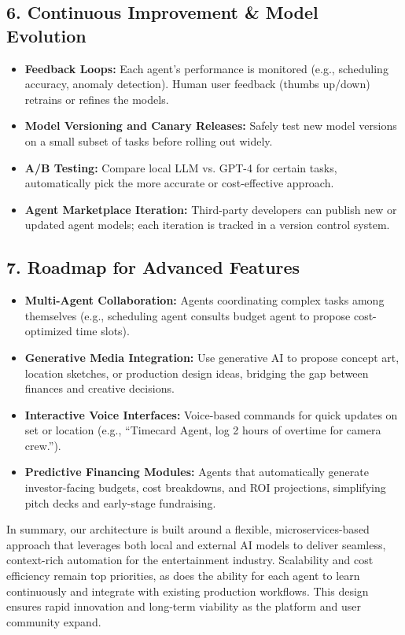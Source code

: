 \documentclass[11pt]{article}
\begin{document}
\subsection{6. Continuous Improvement \& Model Evolution}
\begin{itemize}
    \item \textbf{Feedback Loops:} Each agent’s performance is monitored (e.g., scheduling accuracy, anomaly detection). Human user feedback (thumbs up/down) retrains or refines the models.
    \item \textbf{Model Versioning and Canary Releases:} Safely test new model versions on a small subset of tasks before rolling out widely.
    \item \textbf{A/B Testing:} Compare local LLM vs. GPT-4 for certain tasks, automatically pick the more accurate or cost-effective approach.
    \item \textbf{Agent Marketplace Iteration:} Third-party developers can publish new or updated agent models; each iteration is tracked in a version control system.
\end{itemize}

\subsection{7. Roadmap for Advanced Features}
\begin{itemize}
    \item \textbf{Multi-Agent Collaboration:} Agents coordinating complex tasks among themselves (e.g., scheduling agent consults budget agent to propose cost-optimized time slots).
    \item \textbf{Generative Media Integration:} Use generative AI to propose concept art, location sketches, or production design ideas, bridging the gap between finances and creative decisions.
    \item \textbf{Interactive Voice Interfaces:} Voice-based commands for quick updates on set or location (e.g., “Timecard Agent, log 2 hours of overtime for camera crew.”).
    \item \textbf{Predictive Financing Modules:} Agents that automatically generate investor-facing budgets, cost breakdowns, and ROI projections, simplifying pitch decks and early-stage fundraising.
\end{itemize}

In summary, our architecture is built around a flexible, microservices-based approach that leverages both local and external AI models to deliver seamless, context-rich automation for the entertainment industry. Scalability and cost efficiency remain top priorities, as does the ability for each agent to learn continuously and integrate with existing production workflows. This design ensures rapid innovation and long-term viability as the platform and user community expand.
\end{document}
